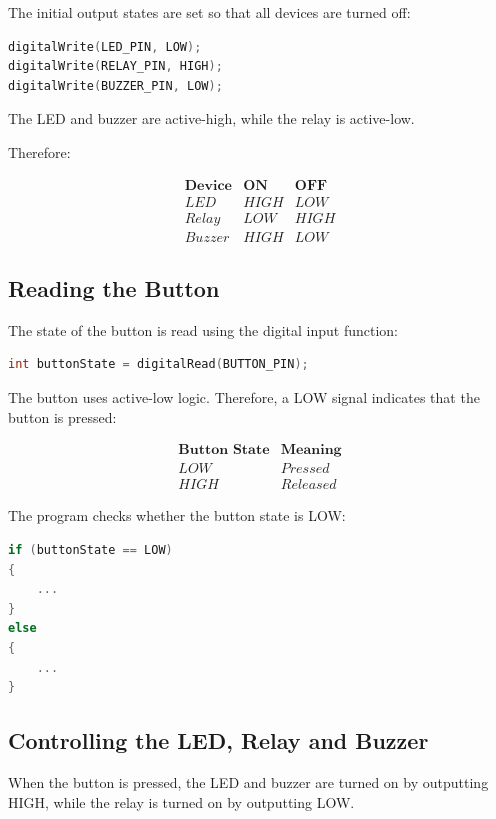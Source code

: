 \documentclass[12pt,a4paper]{article}
\begin{document}
The initial output states are set so that all devices are turned off:

\begin{lstlisting}[language=C]
digitalWrite(LED_PIN, LOW);
digitalWrite(RELAY_PIN, HIGH);
digitalWrite(BUZZER_PIN, LOW);
\end{lstlisting}

The LED and buzzer are active-high, while the relay is active-low.

Therefore:

\[
\begin{array}{c|c|c}
\textbf{Device} & \textbf{ON} & \textbf{OFF} \\
\hline
LED & HIGH & LOW \\
Relay & LOW & HIGH \\
Buzzer & HIGH & LOW
\end{array}
\]

\subsection{Reading the Button}

The state of the button is read using the digital input function:

\begin{lstlisting}[language=C]
int buttonState = digitalRead(BUTTON_PIN);
\end{lstlisting}

The button uses active-low logic. Therefore, a LOW signal indicates
that the button is pressed:

\[
\begin{array}{c|c}
\textbf{Button State} & \textbf{Meaning} \\
\hline
LOW & Pressed \\
HIGH & Released
\end{array}
\]

The program checks whether the button state is LOW:

\begin{lstlisting}[language=C]
if (buttonState == LOW)
{
    ...
}
else
{
    ...
}
\end{lstlisting}

\subsection{Controlling the LED, Relay and Buzzer}

When the button is pressed, the LED and buzzer are turned on by
outputting HIGH, while the relay is turned on by outputting LOW.
\end{document}
